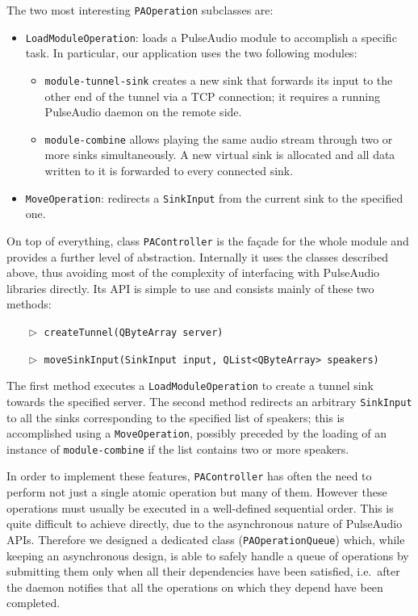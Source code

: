 \documentclass[conference]{IEEEtran}
\begin{document}
The two most interesting \texttt{PAOperation} subclasses are:
\begin{itemize}
	\item \texttt{LoadModuleOperation}: loads a PulseAudio module to accomplish a specific task. In particular, our application uses the two following modules:
	\begin{itemize}
		\item \texttt{module-tunnel-sink} creates a new sink that forwards its input to the other end of the tunnel via a TCP connection; it requires a running PulseAudio daemon on the remote side.
		\item \texttt{module-combine} allows playing the same audio stream through two or more sinks simultaneously. A new virtual sink is allocated and all data written to it is forwarded to every connected sink.
	\end{itemize}
	\item \texttt{MoveOperation}: redirects a \texttt{SinkInput} from the current sink to the specified one.
\end{itemize}

On top of everything, class \texttt{PAController} is the façade for the whole module and provides a further level of abstraction. Internally it uses the classes described above, thus avoiding most of the complexity of interfacing with PulseAudio libraries directly. Its API is simple to use and consists mainly of these two methods:
\begin{itemize}
\item[$\vartriangleright$] \texttt{createTunnel(QByteArray server)}
\item[$\vartriangleright$] \texttt{moveSinkInput(SinkInput input, QList<QByteArray> speakers)}
\end{itemize}
The first method executes a \texttt{LoadModuleOperation} to create a tunnel sink towards the specified server. The second method redirects an arbitrary \texttt{SinkInput} to all the sinks corresponding to the specified list of speakers; this is accomplished using a \texttt{MoveOperation}, possibly preceded by the loading of an instance of \texttt{module-combine} if the list contains two or more speakers.

In order to implement these features, \texttt{PAController} has often the need to perform not just a single atomic operation but many of them. However these operations must usually be executed in a well-defined sequential order. This is quite difficult to achieve directly, due to the asynchronous nature of PulseAudio APIs. Therefore we designed a dedicated class (\texttt{PAOperationQueue}) which, while keeping an asynchronous design, is able to safely handle a queue of operations by submitting them only when all their dependencies have been satisfied, i.e.\ after the daemon notifies that all the operations on which they depend have been completed.
\end{document}
